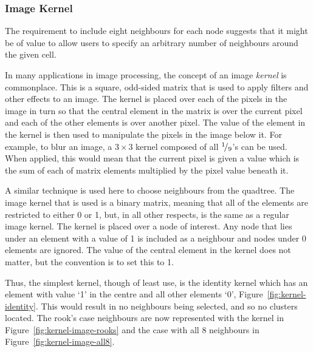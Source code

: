 \subsubsection{Image Kernel}
\label{ssub:Image Kernel}

The requirement to include eight neighbours for each node suggests that it
might be of value to allow users to specify an arbitrary number of neighbours
around the given cell.

In many applications in image processing, the concept of an image \emph{kernel}
is commonplace. This is a square, odd-sided matrix that is used to apply
filters and other effects to an image. The kernel is placed over each of the
pixels in the image in turn so that the central element in the matrix is over
the current pixel and each of the other elements is over another pixel. The
value of the element in the kernel is then used to manipulate the pixels in the
image below it. For example, to blur an image, a $3\times 3$ kernel composed of
all ${}^{1}\!/_{9}$'s can be used. When applied, this would mean that the
current pixel is given a value which is the sum of each of matrix elements
multiplied by the pixel value beneath it.

A similar technique is used here to choose neighbours from the quadtree. The
image kernel that is used is a binary matrix, meaning that all of the elements
are restricted to either 0 or 1, but, in all other respects, is the same as a
regular image kernel. The kernel is placed over a node of interest. Any node
that lies under an element with a value of 1 is included as a neighbour and
nodes under 0 elements are ignored. The value of the central element in the
kernel does not matter, but the convention is to set this to 1.

Thus, the simplest kernel, though of least use, is the identity kernel which
has an element with value `1' in the centre and all other elements `0',
Figure~\ref{fig:kernel-identity}. This would result in no neighbours being
selected, and so no clusters located. The rook's case neighbours are now
represented with the kernel in Figure~\ref{fig:kernel-image-rooks} and the case
with all 8 neighbours in Figure~\ref{fig:kernel-image-all8}.

